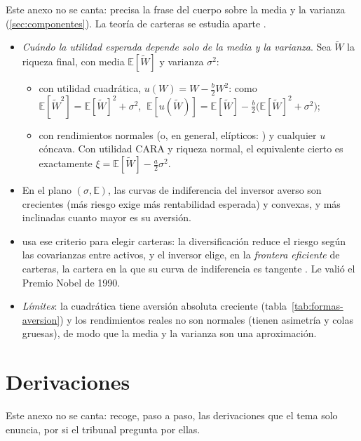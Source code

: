 \documentclass[11pt]{article}
\begin{document}
Este anexo no se canta: precisa la frase del cuerpo sobre la media y la varianza (\ref{sec:componentes}). La teoría de carteras se estudia aparte .

\begin{itemize}
\item \emph{Cuándo la utilidad esperada depende solo de la media y la varianza}\nocite{Tobin1958Liquidity}. Sea $\tilde{W}$ la riqueza final, con media $\mathbb{E}[\tilde{W}]$ y varianza $\sigma^2$:
  \begin{itemize}
  \item con utilidad cuadrática, $u(W)=W-\tfrac{b}{2}W^2$: como $\mathbb{E}[\tilde{W}^2]=\mathbb{E}[\tilde{W}]^2+\sigma^2$, $\ \mathbb{E}[u(\tilde{W})]=\mathbb{E}[\tilde{W}]-\tfrac{b}{2}\big(\mathbb{E}[\tilde{W}]^2+\sigma^2\big)$;
  \item con rendimientos normales (o, en general, elípticos: \textcite{Chamberlain1983Characterization}) y cualquier $u$ cóncava. Con utilidad CARA y riqueza normal, el equivalente cierto es exactamente $\xi=\mathbb{E}[\tilde{W}]-\tfrac{a}{2}\sigma^2$.
  \end{itemize}
\item En el plano $(\sigma,\mathbb{E})$, las curvas de indiferencia del inversor averso son crecientes (más riesgo exige más rentabilidad esperada) y convexas, y más inclinadas cuanto mayor es su aversión.
\item \textcite{Markowitz1952Portfolio} usa ese criterio para elegir carteras: la diversificación reduce el riesgo según las covarianzas entre activos, y el inversor elige, en la \emph{frontera eficiente} de carteras, la cartera en la que su curva de indiferencia es tangente . Le valió el Premio Nobel de 1990\nocite{Nobel1990Markowitz}.
\item \emph{Límites}: la cuadrática tiene aversión absoluta creciente (tabla~\ref{tab:formas-aversion}) y los rendimientos reales no son normales (tienen asimetría y colas gruesas), de modo que la media y la varianza son una aproximación.
\end{itemize}

\section{Derivaciones}\label{anexo:derivaciones}

Este anexo no se canta: recoge, paso a paso, las derivaciones que el tema solo enuncia, por si el tribunal pregunta por ellas.
\end{document}
